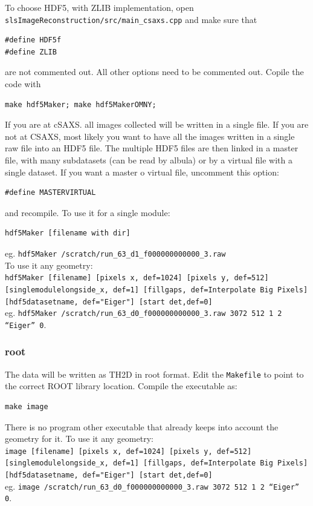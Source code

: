 \documentclass{article}
\begin{document}
To choose HDF5, with ZLIB implementation, open {\tt{slsImageReconstruction/src/main\_csaxs.cpp}} and make sure that 
\begin{verbatim}
#define HDF5f
#define ZLIB
\end{verbatim}
are not commented out. All other options need to be commented out. Copile the code with 
\begin{verbatim}
make hdf5Maker; make hdf5MakerOMNY;
\end{verbatim}

If you are at cSAXS. all images collected will be written in a single file. If you are not at CSAXS, most likely you want to have all the images written in a single raw file into an HDF5 file. The multiple HDF5 files are then linked in a master file, with many subdatasets (can be read by albula) or by a virtual file with a single dataset. If you want a master o virtual file, uncomment this option:
\begin{verbatim}
#define MASTERVIRTUAL
\end{verbatim}
and recompile.
To use it for a single module:
\begin{verbatim}
hdf5Maker [filename with dir]
\end{verbatim}
eg.
{\tt{hdf5Maker /scratch/run\_63\_d1\_f000000000000\_3.raw}}\\

To use it any geometry:\\
{\tt{hdf5Maker [filename] [pixels x, def=1024] [pixels y, def=512] [singlemodulelongside\_x, def=1] [fillgaps, def=Interpolate Big Pixels] [hdf5datasetname, def="Eiger"] [start det,def=0]}}\\
eg.
{\tt hdf5Maker /scratch/run\_63\_d0\_f000000000000\_3.raw  3072 512 1 2 ``Eiger'' 0}.\\

\subsubsection{root}
The data will be written as TH2D in root format. Edit the {\tt{Makefile}} to point to the correct ROOT library location. Compile the executable as:
\begin{verbatim}
make image 
\end{verbatim}
There is no program other executable that already keeps into account the geometry for it.
To use it any geometry:\\
{\tt{image [filename] [pixels x, def=1024] [pixels y, def=512] [singlemodulelongside\_x, def=1] [fillgaps, def=Interpolate Big Pixels] [hdf5datasetname, def="Eiger"] [start det,def=0]}}\\
eg.
{\tt image /scratch/run\_63\_d0\_f000000000000\_3.raw  3072 512 1 2 ``Eiger'' 0}.\\
\end{document}
